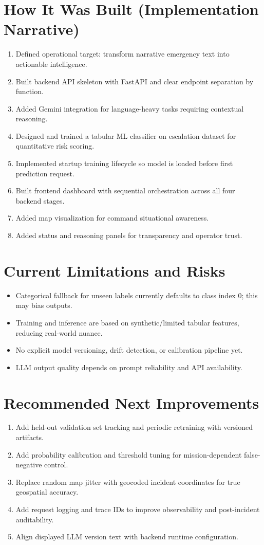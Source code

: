 \documentclass[12pt,a4paper]{article}
\begin{document}
\section{How It Was Built (Implementation Narrative)}
\begin{enumerate}[leftmargin=1.5em]
  \item Defined operational target: transform narrative emergency text into actionable intelligence.
  \item Built backend API skeleton with FastAPI and clear endpoint separation by function.
  \item Added Gemini integration for language-heavy tasks requiring contextual reasoning.
  \item Designed and trained a tabular ML classifier on escalation dataset for quantitative risk scoring.
  \item Implemented startup training lifecycle so model is loaded before first prediction request.
  \item Built frontend dashboard with sequential orchestration across all four backend stages.
  \item Added map visualization for command situational awareness.
  \item Added status and reasoning panels for transparency and operator trust.
\end{enumerate}

\section{Current Limitations and Risks}
\begin{itemize}[leftmargin=1.5em]
  \item Categorical fallback for unseen labels currently defaults to class index 0; this may bias outputs.
  \item Training and inference are based on synthetic/limited tabular features, reducing real-world nuance.
  \item No explicit model versioning, drift detection, or calibration pipeline yet.
  \item LLM output quality depends on prompt reliability and API availability.
\end{itemize}

\section{Recommended Next Improvements}
\begin{enumerate}[leftmargin=1.5em]
  \item Add held-out validation set tracking and periodic retraining with versioned artifacts.
  \item Add probability calibration and threshold tuning for mission-dependent false-negative control.
  \item Replace random map jitter with geocoded incident coordinates for true geospatial accuracy.
  \item Add request logging and trace IDs to improve observability and post-incident auditability.
  \item Align displayed LLM version text with backend runtime configuration.
\end{enumerate}
\end{document}
